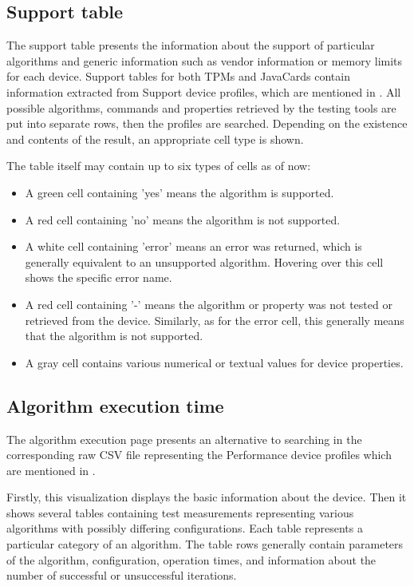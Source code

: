 \subsection{Support table}
The support table presents the information about the support of particular algorithms and generic information such as vendor information or memory limits for each device. Support tables for both TPMs and JavaCards contain information extracted from Support device profiles, which are mentioned in . All possible algorithms, commands and properties retrieved by the testing tools are put into separate rows, then the profiles are searched. Depending on the existence and contents of the result, an appropriate cell type is shown. 

The table itself may contain up to six types of cells as of now:
\begin{itemize}
    \item A green cell containing 'yes' means the algorithm is supported.
    \item A red cell containing 'no' means the algorithm is not supported.
    \item A white cell containing 'error' means an error was returned, which is generally equivalent to an unsupported algorithm. Hovering over this cell shows the specific error name.
    \item A red cell containing '-' means the algorithm or property was not tested or retrieved from the device. Similarly, as for the error cell, this generally means that the algorithm is not supported.
    \item A gray cell contains various numerical or textual values for device properties.
\end{itemize}



\subsection{Algorithm execution time}
The algorithm execution page presents an alternative to searching in the corresponding raw CSV file representing the Performance device profiles which are mentioned in  . 

Firstly, this visualization displays the basic information about the device. Then it shows several tables containing test measurements representing various algorithms with possibly differing configurations. Each table represents a particular category of an algorithm. The table rows generally contain parameters of the algorithm, configuration, operation times, and information about the number of successful or unsuccessful iterations.


